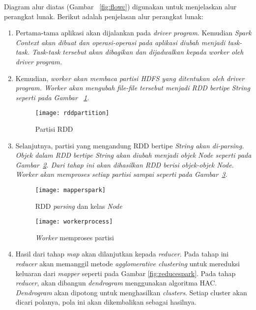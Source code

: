 Diagram alur diatas (Gambar ~\ref{fig:flowc}) digunakan untuk menjelaskan alur perangkat lunak. Berikut adalah penjelasan alur perangkat lunak:

\begin{enumerate}

\item Pertama-tama aplikasi akan dijalankan pada \textit{driver program}. Kemudian \it{Spark Context} akan dibuat dan operasi-operasi pada aplikasi diubah menjadi \it{task-task}. \it{Task-task} tersebut akan dibagikan dan dijadwalkan kepada \it{worker} oleh \it{driver program}. 


\item Kemudian, \it{worker} akan membaca partisi HDFS yang ditentukan oleh \it{driver program}. Worker akan mengubah file-file tersebut menjadi RDD bertipe String seperti pada Gambar ~\ref{fig:rddpartition}.

\begin{figure}[H]
    \centering  
    \texttt{[image: rddpartition]}  
    \caption[Partisi RDD]{Partisi RDD} 
    \label{fig:rddpartition} 
\end{figure}

\item Selanjutnya, partisi yang mengandung RDD bertipe \it{String} akan di-\it{parsing}. Objek dalam RDD bertipe \it{String} akan diubah menjadi objek \it{Node} seperti pada Gambar~\ref{fig:mapperspark}. Dari tahap ini akan dihasilkan RDD berisi objek-objek \it{Node}. Worker akan memproses setiap partisi sampai seperti pada Gambar~\ref{fig:workerprocess}.

\begin{figure}[H]
    \centering  
    \texttt{[image: mapperspark]}  
    \caption[RDD \textit{parsing} dan kelas \textit{Node}]{RDD \textit{parsing} dan kelas \textit{Node}} 
    \label{fig:mapperspark}
\end{figure}

\begin{figure}[H]
    \centering  
    \texttt{[image: workerprocess]}  
    \caption[\textit{Worker} memproses partisi]{\textit{Worker} memproses partisi} 
    \label{fig:workerprocess} 
\end{figure}

\item Hasil dari tahap \textit{map} akan dilanjutkan kepada \textit{reducer}. Pada tahap ini \textit{reducer} akan memanggil metode \textit{agglomerative clustering} untuk mereduksi keluaran dari \textit{mapper} seperti pada Gambar \ref{fig:reducespark}. Pada tahap \textit{reducer}, akan dibangun \textit{dendrogram} menggunakan algoritma HAC. \textit{Dendrogram} akan dipotong untuk menghasilkan \textit{clusters}. Setiap cluster akan dicari polanya, pola ini akan dikembalikan sebagai hasilnya.


\end{enumerate}

